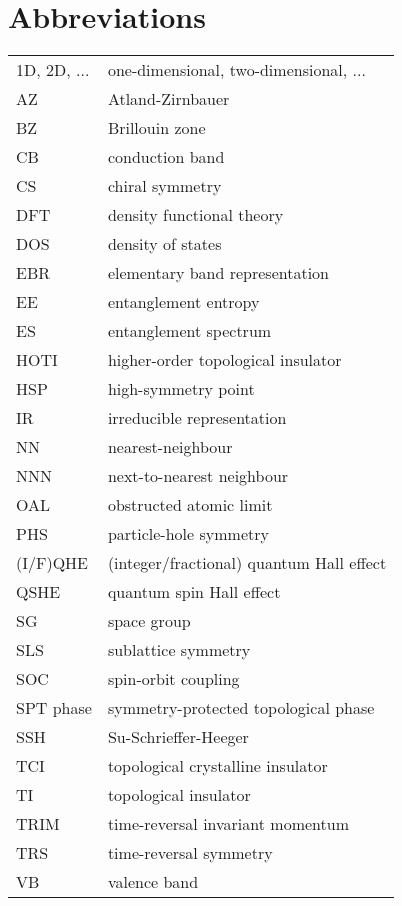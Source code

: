     \chapter*{Abbreviations}
    \begin{tabularx}{\textwidth}{lX}
 
      1D, 2D, $\ldots$ & one-dimensional, two-dimensional,  $\ldots$ \\
      AZ & Atland-Zirnbauer \\
      BZ & Brillouin zone \\
      CB & conduction band \\
      CS & chiral symmetry \\
      DFT & density functional theory \\
      DOS & density of states \\
      EBR & elementary band representation \\
      EE & entanglement entropy \\
      ES & entanglement spectrum \\
      HOTI & higher-order topological insulator \\
      HSP & high-symmetry point \\
      IR & irreducible representation \\
      NN & nearest-neighbour \\
      NNN & next-to-nearest neighbour \\
      OAL & obstructed atomic limit \\
      PHS & particle-hole symmetry \\
      (I/F)QHE & (integer/fractional) quantum Hall effect  \\
      QSHE & quantum spin Hall effect \\
      SG & space group \\
      SLS & sublattice symmetry \\
      SOC & spin-orbit coupling \\
      SPT phase & symmetry-protected topological phase \\ 
      SSH & Su-Schrieffer-Heeger \\ 
      TCI & topological crystalline insulator \\
      TI & topological insulator \\
      TRIM & time-reversal invariant momentum \\
      TRS & time-reversal symmetry \\
      VB & valence band
    \end{tabularx}

  
\endgroup
